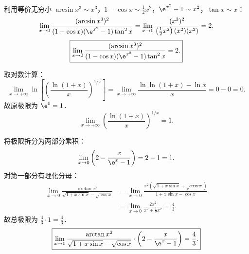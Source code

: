 \begin{solution}

    利用等价无穷小 $\arcsin x^3 \sim x^3$，$1 - \cos x \sim \frac{1}{2}x^2$，$\e^{x^2} - 1 \sim x^2$，$\tan x \sim x$：
    \begin{equation}
        \lim_{x\to 0} \frac{(\arcsin x^3)^2}{(1 - \cos x)(\e^{x^2} - 1)\tan^2 x} = \lim_{x\to 0} \frac{(x^3)^2}{\left(\frac{1}{2}x^2\right)(x^2)(x^2)} = 2.
    \end{equation}
    \begin{equation}
        \boxed{\lim_{x\to 0} \frac{(\arcsin x^3)^2}{(1 - \cos x)(\e^{x^2} - 1)\tan^2 x} = 2.}
    \end{equation}


    取对数计算：
    \begin{equation}
        \lim_{x\to +\infty} \ln\left[ \left( \frac{\ln(1+x)}{x} \right)^{1/x} \right] = \lim_{x\to +\infty} \frac{\ln\ln(1+x) - \ln x}{x} = 0 - 0 = 0.
    \end{equation}
    故原极限为 $\e^0 = 1$．
    \begin{equation}
        \boxed{\lim_{x\to +\infty} \left( \frac{\ln(1+x)}{x} \right)^{1/x} = 1.}
    \end{equation}


    将极限拆分为两部分乘积：
    \begin{equation}
        \lim_{x\to 0} \left( 2 - \frac{x}{\e^x - 1} \right) = 2 - 1 = 1.
    \end{equation}
    对第一部分有理化分母：
    \begin{equation}
        \begin{aligned}
            \lim_{x\to 0} \frac{\arctan x^2}{\sqrt{1 + x\sin x} - \sqrt{\cos x}} & = \lim_{x\to 0} \frac{x^2 (\sqrt{1 + x\sin x} + \sqrt{\cos x})}{1 + x\sin x - \cos x} \\
                                                                                 & = \lim_{x\to 0} \frac{2x^2}{x^2 + \frac{1}{2}x^2} = \frac{4}{3}.
        \end{aligned}
    \end{equation}
    故总极限为 $\frac{4}{3} \cdot 1 = \frac{4}{3}$．
    \begin{equation}
        \boxed{\lim_{x\to 0} \frac{\arctan x^2}{\sqrt{1 + x\sin x} - \sqrt{\cos x}} \cdot \left( 2 - \frac{x}{\e^x - 1} \right) = \frac{4}{3}.}
    \end{equation}



\end{solution}
